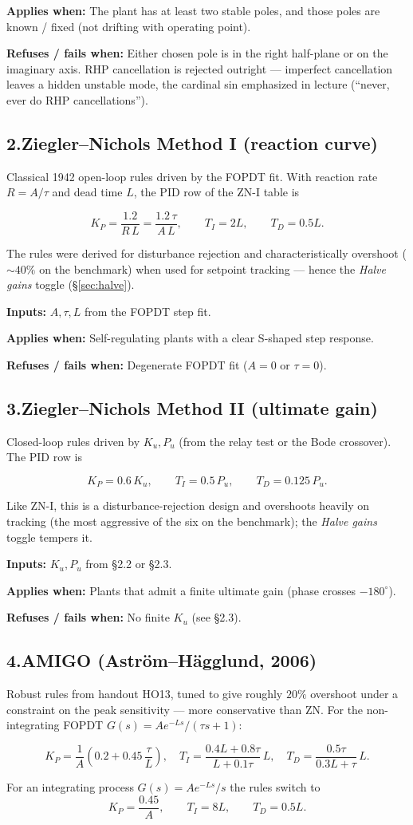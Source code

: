\documentclass[11pt]{article}
\newcommand{\keybox}[1]{%
  \par\vspace{0.4em}%
  \noindent\colorbox{boxbg}{%
    \begin{minipage}{\dimexpr\linewidth-2\fboxsep\relax}%
      \vspace{0.3em}#1\vspace{0.3em}%
    \end{minipage}}%
  \par\vspace{0.4em}%
}
\newcommand{\applies}[1]{\smallskip\noindent\textbf{Applies when:} #1\par}
\newcommand{\refuses}[1]{\noindent\textbf{Refuses / fails when:} #1\par}
\newcommand{\inputs}[1]{\noindent\textbf{Inputs:} #1\par}
\begin{document}
\applies{The plant has at least two stable poles, and those poles are known /
fixed (not drifting with operating point).}
\refuses{Either chosen pole is in the right half-plane or on the imaginary
axis. RHP cancellation is rejected outright --- imperfect cancellation leaves
a hidden unstable mode, the cardinal sin emphasized in lecture
(``never, ever do RHP cancellations'').}

\subsection{2.\quad Ziegler--Nichols Method I (reaction curve)}

Classical 1942 open-loop rules driven by the FOPDT fit. With reaction rate
$R = A/\tau$ and dead time $L$, the PID row of the ZN-I table is
\keybox{\[
  K_P = \frac{1.2}{R\,L} = \frac{1.2\,\tau}{A\,L}, \qquad
  T_I = 2L, \qquad
  T_D = 0.5L .
\]}
The rules were derived for disturbance rejection and characteristically
overshoot ($\sim 40\%$ on the benchmark) when used for setpoint tracking ---
hence the \emph{Halve gains} toggle (\S\ref{sec:halve}).

\inputs{$A,\tau,L$ from the FOPDT step fit.}
\applies{Self-regulating plants with a clear S-shaped step response.}
\refuses{Degenerate FOPDT fit ($A=0$ or $\tau=0$).}

\subsection{3.\quad Ziegler--Nichols Method II (ultimate gain)}

Closed-loop rules driven by $K_u, P_u$ (from the relay test or the Bode
crossover). The PID row is
\keybox{\[
  K_P = 0.6\,K_u, \qquad
  T_I = 0.5\,P_u, \qquad
  T_D = 0.125\,P_u .
\]}
Like ZN-I, this is a disturbance-rejection design and overshoots heavily on
tracking (the most aggressive of the six on the benchmark); the
\emph{Halve gains} toggle tempers it.

\inputs{$K_u, P_u$ from \S2.2 or \S2.3.}
\applies{Plants that admit a finite ultimate gain (phase crosses
$-180^\circ$).}
\refuses{No finite $K_u$ (see \S2.3).}

\subsection{4.\quad AMIGO (Aström--Hägglund, 2006)}

Robust rules from handout HO13, tuned to give roughly $20\%$ overshoot under a
constraint on the peak sensitivity --- more conservative than ZN. For the
non-integrating FOPDT $G(s) = A e^{-Ls}/(\tau s + 1)$:
\keybox{\[
  K_P = \frac{1}{A}\!\left(0.2 + 0.45\,\frac{\tau}{L}\right), \quad
  T_I = \frac{0.4L + 0.8\tau}{L + 0.1\tau}\,L, \quad
  T_D = \frac{0.5\tau}{0.3L + \tau}\,L .
\]}
For an integrating process $G(s) = A e^{-Ls}/s$ the rules switch to
\[
  K_P = \frac{0.45}{A}, \qquad
  T_I = 8L, \qquad
  T_D = 0.5L .
\]
\end{document}
